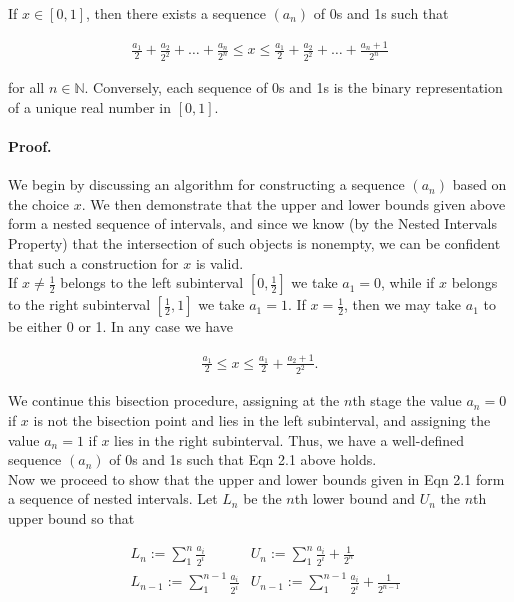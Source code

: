 \documentclass[paper=a4, fontsize=11pt]{scrartcl} %
\numberwithin{equation}{section} %
\numberwithin{figure}{section} %
\numberwithin{table}{section} %
\begin{document}
If $x \in [0,1]$, then there exists a sequence $(a_n)$ of 0s and 1s such that

\begin{align} 
\frac{a_1}{2} + \frac{a_2}{2^2} + \dots + \frac{a_n}{2^n} \leq x \leq \frac{a_1}{2} + \frac{a_2}{2^2} + \dots + \frac{a_n + 1}{2^n}
\end{align}

for all $n \in \mathbb{N}$. Conversely, each sequence of 0s and 1s is the binary representation of a unique real number in $[0,1]$.\\

\paragraph{Proof.} We begin by discussing an algorithm for constructing a sequence $(a_n)$ based on the choice $x$. We then demonstrate that the upper and lower bounds given above form a nested sequence of intervals, and since we know (by the Nested Intervals Property) that the intersection of such objects is nonempty, we can be confident that such a construction for $x$ is valid.\\

If $x \neq \frac{1}{2}$ belongs to the left subinterval $[0,\frac{1}{2}]$ we take $a_1 = 0$, while if $x$ belongs to the right subinterval $[\frac{1}{2},1]$ we take $a_1 = 1$. If $x = \frac{1}{2}$, then we may take $a_1$ to be either 0 or 1. In any case we have

\begin{align}
\frac{a_1}{2} \leq x \leq \frac{a_1}{2} + \frac{a_2 + 1}{2^2}.
\end{align}

We continue this bisection procedure, assigning at the $n$th stage the value $a_n = 0$ if $x$ is not the bisection point and lies in the left subinterval, and assigning the value $a_n = 1$ if $x$ lies in the right subinterval. Thus, we have a well-defined sequence $(a_n)$ of 0s and 1s such that Eqn 2.1 above holds.\\

Now we proceed to show that the upper and lower bounds given in Eqn 2.1 form a sequence of nested intervals. Let $L_n$ be the $n$th lower bound and $U_n$ the $n$th upper bound so that

\begin{align*}
&L_n := \sum_{1}^{n} \frac{a_i}{2^i}       &U_n := \sum_{1}^{n} \frac{a_i}{2^i} + \frac{1}{2^n}\\
&L_{n-1} := \sum_{1}^{n-1} \frac{a_i}{2^i} &U_{n-1} := \sum_{1}^{n-1} \frac{a_i}{2^i} + \frac{1}{2^{n-1}}
\end{align*}
\end{document}
